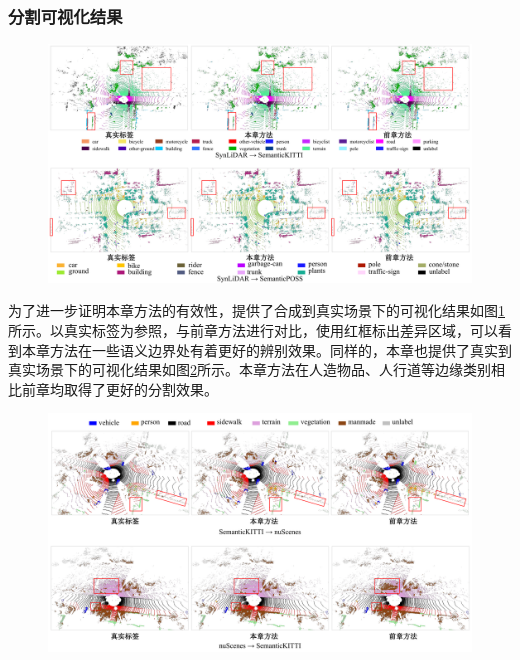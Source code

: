     \subsubsection{分割可视化结果}
    \vspace{-0.1cm}
    \begin{figure}[h]
        \centering
        \includegraphics[width = \textwidth, scale=0.5]{ljx/figure/4-5s2r.pdf}
        \label{fig:4-5}
    \end{figure}
    \vspace{-0.35cm}
    为了进一步证明本章方法的有效性，提供了合成到真实场景下的可视化结果如图\ref{fig:4-5}所示。以真实标签为参照，与前章方法进行对比，使用红框标出差异区域，可以看到本章方法在一些语义边界处有着更好的辨别效果。同样的，本章也提供了真实到真实场景下的可视化结果如图\ref{fig:4-6}所示。本章方法在人造物品、人行道等边缘类别相比前章均取得了更好的分割效果。
    \vspace{-0.1cm}
    \begin{figure}[h]
        \centering
        \includegraphics[width = \textwidth, scale=0.5]{ljx/figure/4-6r2r.pdf}
        \label{fig:4-6}
    \end{figure}
    \vspace{-0.35cm}
